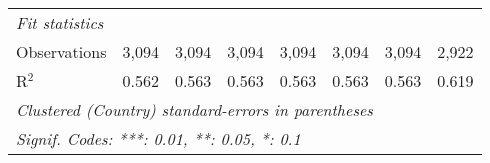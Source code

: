 \begin{tabular}{lccccccc}
   \midrule \emph{Fit statistics}\\
   Observations                                                           & 3,094          & 3,094         & 3,094         & 3,094         & 3,094         & 3,094         & 2,922\\  
   R$^2$                                                                  & 0.562          & 0.563         & 0.563         & 0.563         & 0.563         & 0.563         & 0.619\\  
   \midrule
   \multicolumn{8}{l}{\emph{Clustered (Country) standard-errors in parentheses}}\\
   \multicolumn{8}{l}{\emph{Signif. Codes: ***: 0.01, **: 0.05, *: 0.1}}\\
\end{tabular}
\par\endgroup


